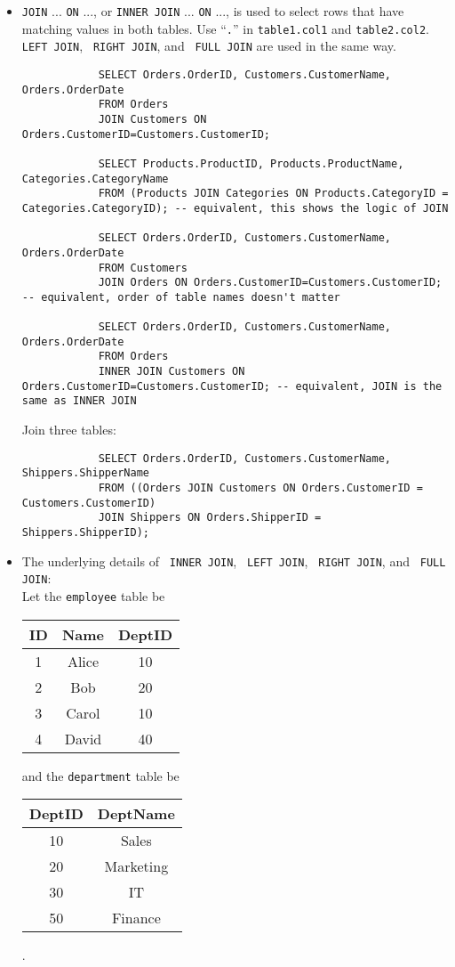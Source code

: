 \documentclass{article}
\begin{document}
	\begin{itemize}
		\item \texttt{\color{red}JOIN} ... \texttt{\color{red}ON} ..., or \texttt{\color{red}INNER JOIN} ... \texttt{\color{red}ON} ..., is used to select rows that have matching values in both tables. Use ``\texttt{\color{red}.}'' in \texttt{table1.col1} and \texttt{table2.col2}. \texttt{\color{red} LEFT JOIN}, \texttt{\color{red} RIGHT JOIN}, and \texttt{\color{red} FULL JOIN} are used in the same way.
		
		\begin{lstlisting}
			SELECT Orders.OrderID, Customers.CustomerName, Orders.OrderDate
			FROM Orders
			JOIN Customers ON Orders.CustomerID=Customers.CustomerID;
			
			SELECT Products.ProductID, Products.ProductName, Categories.CategoryName
			FROM (Products JOIN Categories ON Products.CategoryID = Categories.CategoryID); -- equivalent, this shows the logic of JOIN
			
			SELECT Orders.OrderID, Customers.CustomerName, Orders.OrderDate
			FROM Customers
			JOIN Orders ON Orders.CustomerID=Customers.CustomerID; -- equivalent, order of table names doesn't matter
			
			SELECT Orders.OrderID, Customers.CustomerName, Orders.OrderDate
			FROM Orders
			INNER JOIN Customers ON Orders.CustomerID=Customers.CustomerID; -- equivalent, JOIN is the same as INNER JOIN
		\end{lstlisting}
		
		Join three tables:
		\begin{lstlisting}
			SELECT Orders.OrderID, Customers.CustomerName, Shippers.ShipperName
			FROM ((Orders JOIN Customers ON Orders.CustomerID = Customers.CustomerID)
			JOIN Shippers ON Orders.ShipperID = Shippers.ShipperID);
		\end{lstlisting}
		
		\item The underlying details of \texttt{\color{red} INNER JOIN}, \texttt{\color{red} LEFT JOIN}, \texttt{\color{red} RIGHT JOIN}, and \texttt{\color{red} FULL JOIN}:\\
		
		Let the \texttt{employee} table be
		\begin{tabular}{|c|c|c|}
			ID & Name  & DeptID\\
			\hline
			1  & Alice & 10\\
			2  & Bob   & 20\\
			3  & Carol & 10\\
			4  & David & 40
		\end{tabular} and the \texttt{department} table be
		\begin{tabular}{|c|c|}
			DeptID & DeptName\\
			\hline
			10 & Sales\\
			20 & Marketing\\
			30 & IT\\
			50 & Finance
		\end{tabular} .\\
		

\end{itemize}
\end{document}
